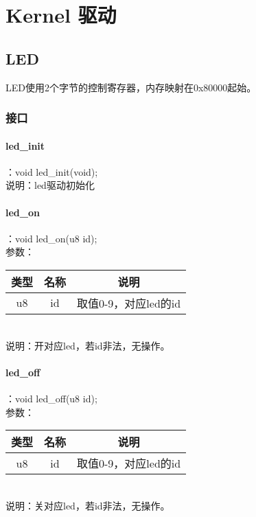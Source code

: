 %
% 
% 
% 
% 
% 
% 
%

\chapter{Kernel 驱动}
\section{LED}
LED使用2个字节的控制寄存器，内存映射在0x80000起始。
\subsection{接口}

\subsubsection{led\_init}
：void led\_init(void);\\
说明：led驱动初始化

\subsubsection{led\_on}
：void led\_on(u8 id);\\
参数：\\
\begin{tabular}{|c|c|c|}
    \hline
    类型 & 名称 & 说明\\\hline
    u8 & id & 取值0-9，对应led的id\\\hline
\end{tabular}\\
说明：开对应led，若id非法，无操作。

\subsubsection{led\_off}
：void led\_off(u8 id);\\
参数：\\
\begin{tabular}{|c|c|c|}
    \hline
    类型 & 名称 & 说明\\\hline
    u8 & id & 取值0-9，对应led的id\\\hline
\end{tabular}\\
说明：关对应led，若id非法，无操作。

